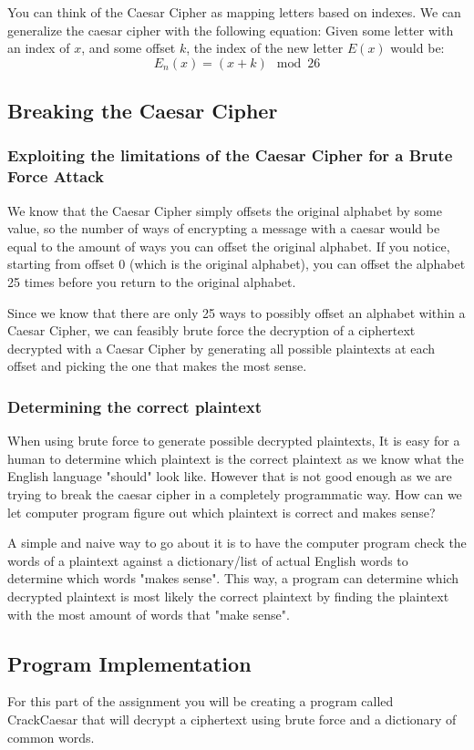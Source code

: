 \documentclass{article}
\begin{document}
You can think of the Caesar Cipher as mapping letters based on indexes. We can generalize the caesar cipher with the following equation:
Given some letter with an index of $x$, and some offset $k$, the index of the new letter $E(x)$ would be:
$$E_n(x)=(x+k)\mod 26$$

\subsection{Breaking the Caesar Cipher}
\subsubsection*{Exploiting the limitations of the Caesar Cipher for a Brute Force Attack}
We know that the Caesar Cipher simply offsets the original alphabet by some value, so the number of ways of encrypting a message with a caesar would be equal to the amount of ways you can offset the original alphabet. If you notice, starting from offset 0 (which is the original alphabet), you can offset the alphabet 25 times before you return to the original alphabet.

Since we know that there are only 25 ways to possibly offset an alphabet within a Caesar Cipher, we can feasibly brute force the decryption of a ciphertext decrypted with a Caesar Cipher by generating all possible plaintexts at each offset and picking the one that makes the most sense.

\subsubsection*{Determining the correct plaintext}
When using brute force to generate possible decrypted plaintexts, It is easy for a human to determine which plaintext is the correct plaintext as we know what the English language "should" look like. However that is not good enough as we are trying to break the caesar cipher in a completely programmatic way. How can we let computer program figure out which plaintext is correct and makes sense?

A simple and naive way to go about it is to have the computer program check the words of a plaintext against a dictionary/list of actual English words to determine which words "makes sense". This way, a program can determine which decrypted plaintext is most likely the correct plaintext by finding the plaintext with the most amount of words that "make sense".

\subsection{Program Implementation}
For this part of the assignment you will be creating a program called CrackCaesar that will decrypt a ciphertext using brute force and a dictionary of common words. \\
\end{document}
